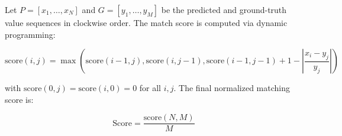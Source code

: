 \documentclass[
	letterpaper, %
]{jdf}
\begin{document}
Let $P = [x_1, \dots, x_N]$ and $G = [y_1, \dots, y_M]$ be the predicted and ground-truth value sequences in clockwise order. The match score is computed via dynamic programming:

\[
\text{score}(i,j) = \max\left(
\text{score}(i{-}1, j),
\text{score}(i, j{-}1),
\text{score}(i{-}1, j{-}1) + 1 - \left\lvert \frac{x_i - y_j}{y_j} \right\rvert
\right)
\]

with $\text{score}(0, j) = \text{score}(i, 0) = 0$ for all $i, j$. The final normalized matching score is:

\[
\text{Score} = \frac{\text{score}(N, M)}{M}
\]
\end{document}
